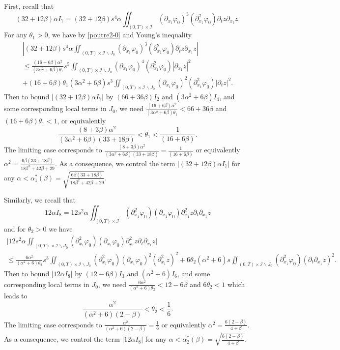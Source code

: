 \documentclass[a4paper, 12pt]{article}
\theoremstyle{plain}
\theoremstyle{definition}
\numberwithin{theorem}{section}
\numberwithin{equation}{section}
\begin{document}
{First, recall that
$$
(32+12\beta)\alpha I_7=(32+12\beta)s^4\alpha\iint_{(0,T)\times\mathcal{I}}(\partial_{x_1}\varphi_0)^3(\partial^2_{x_1}\varphi_0)\partial_tz\partial_{x_1}z.
$$
For any $\theta_1>0$, we have by \eqref{poutre2-0} and Young's inequality
\begin{multline}\label{F7CS}
\left|(32+12\beta)s^4\alpha\iint_{(0,T)\times\mathcal{I}\backslash J_0}(\partial_{x_1}\varphi_0)^3(\partial^2_{x_1}\varphi_0)\partial_tz\partial_{x_1}z\right|\\
\leq \frac{(16+6\beta)\alpha^2}{(3\alpha^2+6\beta)\theta_1}s^5\iint_{(0,T)\times\mathcal{I}\backslash J_0}(\partial_{x_1}\varphi_0)^4(\partial^2_{x_1}\varphi_0)|\partial_{x_1}z|^2\\
+(16+6\beta)\theta_1(3\alpha^2+6\beta) s^3\iint_{(0,T)\times\mathcal{I}\backslash J_0}(\partial_{x_1}\varphi_0)^2(\partial^2_{x_1}\varphi_0)|\partial_tz|^2.
\end{multline}
Then to bound $|(32+12\beta)\alpha I_7|$ by $(66+36\beta) I_2$ and $(3\alpha^2+6\beta) I_4$, and some corresponding local terms in $J_0$, we need $\frac{(16+6\beta)\alpha^2}{(3\alpha^2+6\beta)\theta_1}<66+36\beta$ and $(16+6\beta)\theta_1<1$, or equivalently
$$\frac{(8+3\beta)\alpha^2}{(3\alpha^2+6\beta)(33+18\beta)}<\theta_1<\frac{1}{(16+6\beta)}.$$
The limiting case corresponds to $ \frac{(8+3\beta)\alpha^2}{(3\alpha^2+6\beta)(33+18\beta)}=\frac{1}{(16+6\beta)}$ or equivalently $ \alpha^2=\frac{6\beta(33+18\beta)}{18\beta^2+42\beta+29}$. %
As a consequence, we control the term $|(32+12\beta)\alpha I_7|$ for any $\displaystyle \alpha< \alpha_1^*(\beta)=\sqrt{\frac{6\beta(33+18\beta)}{18\beta^2+42\beta+29}}$.

Similarly, we recall that
$$
12 \alpha I_8=12s^2\alpha\iint_{(0,T)\times\mathcal{I}}(\partial^2_{x_1}\varphi_0)(\partial_{x_1}\varphi_0)\partial^2_{x_1}z\partial_t\partial_{x_1}z
$$
and for $\theta_2>0$ we have
\begin{multline}\label{F8CS}
\big|12s^2\alpha\iint_{(0,T)\times\mathcal{I}\backslash J_0}(\partial^2_{x_1}\varphi_0)(\partial_{x_1}\varphi_0)\partial^2_{x_1}z\partial_t\partial_{x_1}z\big|\\
\leq \frac{6\alpha^2}{(\alpha^2+6)\theta_2}s^3\iint_{(0,T)\times\mathcal{I}\backslash J_0}(\partial^2_{x_1}\varphi_0)(\partial_{x_1}\varphi_0)^2(\partial^2_{x_1}z)^2+6\theta_2(\alpha^2+6)s\iint_{(0,T)\times\mathcal{I}\backslash J_0}(\partial^2_{x_1}\varphi_0)(\partial_t\partial_{x_1}z)^2.    
\end{multline}
Then to bound $|12 \alpha I_8|$ by $(12-6\beta) I_3$ and $(\alpha^2+6)I_6$, and some corresponding local terms in $J_0$, we need $\frac{6\alpha^2}{(\alpha^2+6)\theta_2}<12-6\beta$ and $6\theta_2<1$ which leads to
 $$\frac{\alpha^2}{(\alpha^2+6)(2-\beta)}<\theta_2<\frac{1}{6}.$$
The limiting case  corresponds to $\frac{\alpha^2}{(\alpha^2+6)(2-\beta)}=\frac16$ or equivalently $\alpha^2=\frac{6(2-\beta)}{4+\beta}$.
As a consequence, we control the term $|12 \alpha I_8|$ for any $\displaystyle \alpha < \alpha_2^*(\beta)=\sqrt{\frac{6(2-\beta)}{4+\beta}}$. 

}
\end{document}
